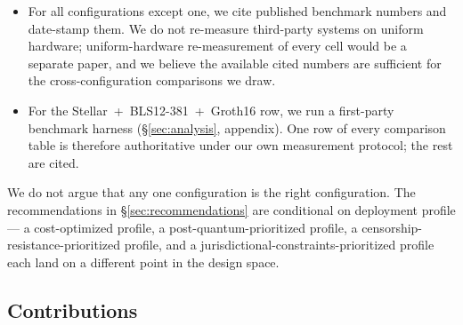 \begin{itemize}
  \item For all configurations except one, we cite published
    benchmark numbers and date-stamp them. We do not re-measure
    third-party systems on uniform hardware; uniform-hardware
    re-measurement of every cell would be a separate paper, and we
    believe the available cited numbers are sufficient for the
    cross-configuration comparisons we draw.
  \item For the Stellar~+~BLS12-381~+~Groth16 row, we run a
    first-party benchmark harness (\S\ref{sec:analysis},
    appendix). One row of every comparison table is therefore
    authoritative under our own measurement protocol; the rest are
    cited.
\end{itemize}

We do not argue that any one configuration is the right configuration.
The recommendations in \S\ref{sec:recommendations} are conditional on
deployment profile --- a cost-optimized profile, a
post-quantum-prioritized profile, a censorship-resistance-prioritized
profile, and a jurisdictional-constraints-prioritized profile each
land on a different point in the design space.

\subsection*{Contributions}

